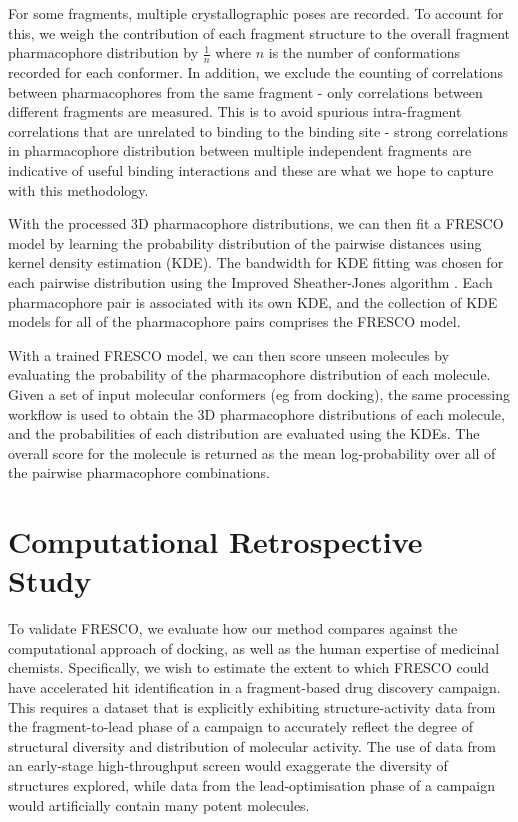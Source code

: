 For some fragments, multiple crystallographic poses are recorded. To account for this, we weigh the contribution of each fragment structure to the overall fragment pharmacophore distribution by $\frac{1}{n}$ where $n$ is the number of conformations recorded for each conformer. In addition, we exclude the counting of correlations between pharmacophores from the same fragment - only correlations between different fragments are measured. This is to avoid spurious intra-fragment correlations that are unrelated to binding to the binding site - strong correlations in pharmacophore distribution between multiple independent fragments are indicative of useful binding interactions and these are what we hope to capture with this methodology.

With the processed 3D pharmacophore distributions, we can then fit a FRESCO model by learning the probability distribution of the pairwise distances using kernel density estimation (KDE). The bandwidth for KDE fitting was chosen for each pairwise distribution using the Improved Sheather-Jones algorithm \cite{Botev2010ISJ}. Each pharmacophore pair is associated with its own KDE, and the collection of KDE models for all of the pharmacophore pairs comprises the FRESCO model.

With a trained FRESCO model, we can then score unseen molecules by evaluating the probability of the pharmacophore distribution of each molecule. Given a set of input molecular conformers (eg from docking), the same processing workflow is used to obtain the 3D pharmacophore distributions of each molecule, and the probabilities of each distribution are evaluated using the KDEs. The overall score for the molecule is returned as the mean log-probability over all of the pairwise pharmacophore combinations.

\section{Computational Retrospective Study} \label{sec:retrospective}

To validate FRESCO, we evaluate how our method compares against the computational approach of docking, as well as the human expertise of medicinal chemists. Specifically, we wish to estimate the extent to which FRESCO could have accelerated hit identification in a fragment-based drug discovery campaign. This requires a dataset that is explicitly exhibiting structure-activity data from the fragment-to-lead phase of a campaign to accurately reflect the degree of structural diversity and distribution of molecular activity. The use of data from an early-stage high-throughput screen would exaggerate the diversity of structures explored, while data from the lead-optimisation phase of a campaign would artificially contain many potent molecules.

